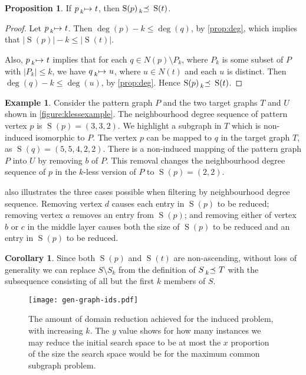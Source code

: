 \documentclass[letterpaper]{article}
\theoremstyle{definition}
\newtheorem{corollary}{Corollary}
\newtheorem{example}{Example}
\newtheorem{proposition}{Proposition}
\newcommand{\lessmap}[1]{\prescript{}{#1}{\mapsto}\ }
\newcommand{\lesspreceq}[1]{\prescript{}{#1}{\preceq}\ }
\newcommand{\nds}{\operatorname{S}}
\begin{document}
\begin{proposition}\label{prop:nds}
If $p \lessmap{k} t$, then $\nds(p) \lesspreceq{k} \nds(t)$.
\end{proposition}
\begin{proof}
Let $p \lessmap{k} t$.  Then $\deg(p) - k \leq \deg(q)$, by \cref{prop:deg}, which
implies that $\left|\nds(p)\right| -k \leq \left| \nds(t) \right| $.

Also, $p \lessmap{k} t$ implies that for each $q \in N(p) \setminus P_k$, where $P_k$
is some subset of $P$ with $\left| P_k \right| \leq k$, we have $q \lessmap{k} u$, where $u \in N(t)$ and
each $u$ is distinct.  Then $\deg(q) - k \leq \deg(u)$, by \cref{prop:deg}.  Hence $\nds(p)
\lesspreceq{k} \nds(t)$.
\end{proof}

\begin{example}
Consider the pattern graph $P$ and the two target graphs $T$ and $U$ shown in
\cref{figure:klessexample}. The neighbourhood degree sequence of pattern vertex $p$ is
$\nds(p)=(3,3,2)$.
We highlight a subgraph in $T$ which is non-induced isomorphic to $P$. The vertex $p$ can be
mapped to $q$ in the target graph $T$, as $\nds(q)=(5,5,4,2,2)$.  There is a non-induced
mapping of the pattern graph $P$ into $U$ by removing $b$ of $P$.  This removal
changes the neighbourhood degree sequence of $p$ in the $k$-less version of $P$ to $\nds(p)=(2,2)$.
\end{example}

 also illustrates the three cases possible when filtering by neighbourhood
degree sequence.  Removing vertex $d$ causes each entry in $\nds(p)$ to be reduced; removing vertex
$a$ removes an entry from $\nds(p)$; and removing either of vertex $b$ or $c$ in the middle layer
causes both the size of $\nds(p)$ to be reduced and an entry in $\nds(p)$ to be reduced.

\begin{corollary}
Since both $\nds(p)$ and $\nds(t)$ are non-ascending, without loss of generality we can replace
$S \setminus S_k$ from the definition of $S \lesspreceq{k} T$ with the subsequence consisting of all
    but the first $k$ members of $S$.
\end{corollary}

\begin{figure}
    \centering
    \texttt{[image: gen-graph-ids.pdf]}
    \caption{The amount of domain reduction achieved for the induced problem, with increasing
    $k$. The $y$ value shows for how many instances we may reduce the initial search space to be
    at most the $x$ proportion of the size the search space would be for the maximum common subgraph
    problem.}\label{figure:ids}
\end{figure}
\end{document}
